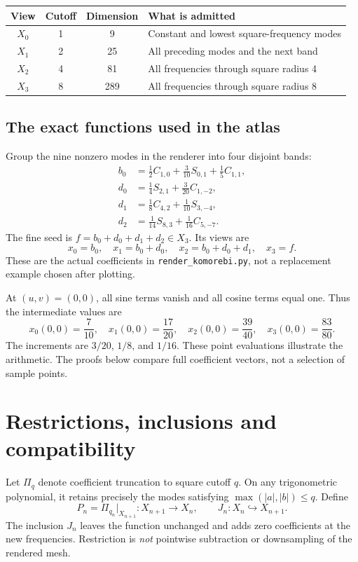\documentclass[11pt]{article}
\theoremstyle{definition}
\theoremstyle{remark}
\begin{document}
\begin{center}
\begin{tabular}{@{}cccl@{}}
\toprule
View & Cutoff & Dimension & What is admitted\\
\midrule
$X_0$ & 1 & 9 & Constant and lowest square-frequency modes\\
$X_1$ & 2 & 25 & All preceding modes and the next band\\
$X_2$ & 4 & 81 & All frequencies through square radius 4\\
$X_3$ & 8 & 289 & All frequencies through square radius 8\\
\bottomrule
\end{tabular}
\end{center}

\subsection{The exact functions used in the atlas}
Group the nine nonzero modes in the renderer into four disjoint bands:
\begin{align}
 b_0&=\tfrac12 C_{1,0}+\tfrac3{10}S_{0,1}+\tfrac15 C_{1,1},\label{eq:b0}\\
 d_0&=\tfrac14 S_{2,1}+\tfrac3{20}C_{1,-2},\label{eq:d0}\\
 d_1&=\tfrac18 C_{4,2}+\tfrac1{10}S_{3,-4},\label{eq:d1}\\
 d_2&=\tfrac1{14}S_{8,3}+\tfrac1{16}C_{5,-7}.\label{eq:d2}
\end{align}
The fine seed is $f=b_0+d_0+d_1+d_2\in X_3$. Its views are
\[
 x_0=b_0,\quad x_1=b_0+d_0,\quad
 x_2=b_0+d_0+d_1,\quad x_3=f.
\]
These are the actual coefficients in \texttt{render\_komorebi.py}, not a replacement example chosen after plotting.

At $(u,v)=(0,0)$, all sine terms vanish and all cosine terms equal one. Thus the intermediate values are
\[
 x_0(0,0)=\frac7{10},\quad
 x_1(0,0)=\frac{17}{20},\quad
 x_2(0,0)=\frac{39}{40},\quad
 x_3(0,0)=\frac{83}{80}.
\]
The increments are $3/20$, $1/8$, and $1/16$. These point evaluations illustrate the arithmetic. The proofs below compare full coefficient vectors, not a selection of sample points.

\section{Restrictions, inclusions and compatibility}
Let $\Pi_q$ denote coefficient truncation to square cutoff $q$. On any trigonometric polynomial, it retains precisely the modes satisfying $\max(|a|,|b|)\leq q$. Define
\[
 P_n=\Pi_{q_n}|_{X_{n+1}}:X_{n+1}\longrightarrow X_n,
 \qquad J_n:X_n\hookrightarrow X_{n+1}.
\]
The inclusion $J_n$ leaves the function unchanged and adds zero coefficients at the new frequencies. Restriction is \emph{not} pointwise subtraction or downsampling of the rendered mesh.
\end{document}
